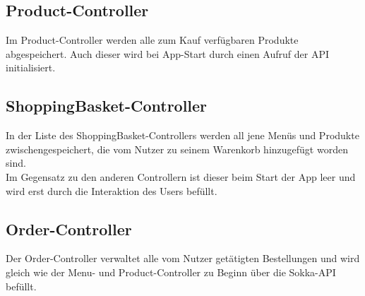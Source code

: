 \subsection{Product-Controller}

Im Product-Controller werden alle zum Kauf verfügbaren Produkte abgespeichert. Auch dieser wird
bei App-Start durch einen Aufruf der API initialisiert.

\subsection{ShoppingBasket-Controller}

In der Liste des ShoppingBasket-Controllers werden all jene Menüs und Produkte zwischengespeichert, die 
vom Nutzer zu seinem Warenkorb hinzugefügt worden sind.\\
Im Gegensatz zu den anderen Controllern ist dieser beim Start der App leer und wird erst durch
die Interaktion des Users befüllt.

\subsection{Order-Controller}

Der Order-Controller verwaltet alle vom Nutzer getätigten Bestellungen und wird gleich wie der
Menu- und Product-Controller zu Beginn über die Sokka-API befüllt.
